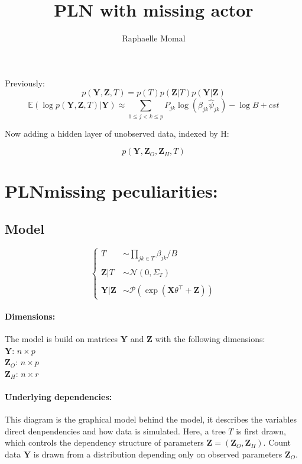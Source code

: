 \documentclass[11pt,a4paper]{article}
\author{Raphaelle Momal}
\title{PLN with missing actor}
\newcommand{\Xbf}{\boldsymbol{X}}
\newcommand{\Ybf}{\boldsymbol{Y}}
\newcommand{\Zbf}{\boldsymbol{Z}}
\newcommand{\Esp}{\mathds{E}}
\newcommand{\edgeunit}{1.5}
\begin{document}
\maketitle
\vspace{3cm}
\tableofcontents
\newpage
Previously:
$$ p(\Ybf,\Zbf,T) = p(T)p(\Zbf|T)p(\Ybf|\Zbf)$$
$$ \Esp(\log p(\Ybf,\Zbf,T)|\Ybf) \approx \sum_{1 \leq j < k \leq p} P_{jk} \log\left(\beta_{jk} \hat{\psi}_{jk}\right) - \log B + cst$$

Now adding a hidden layer of unobserved data, indexed by H:

$$ p(\Ybf,\Zbf_O,\Zbf_H,T)$$
\section{PLNmissing peculiarities:}

\subsection{Model}

$$\left\{\begin{array}{rl}
T & \sim\prod_{jk \in T} \beta_{jk}/B \\\\
\Zbf|T& \sim\mathcal{N}(0,\Sigma_T)\\\\
\Ybf|\Zbf&\sim\mathcal{P}( \exp( \Xbf\theta^\intercal + \Zbf) )
\end{array} \right.$$

\paragraph{Dimensions:}
The model is build on matrices $\Ybf$ and $\Zbf$ with the following dimensions:\\
$\Ybf$: $n\times p$\\
$\Zbf_O$: $n\times p$\\
$\Zbf_H$: $n\times r$


\paragraph{Underlying dependencies:} This diagram is the graphical model behind the model, it describes the variables direct denpendencies and how data is simulated. Here, a tree $T$ is first drawn, which controls the dependency structure of parameters $\Zbf = (\Zbf_O,\Zbf_H)$. Count data $\Ybf$ is drawn from a distribution depending only on observed parameters $\Zbf_O$.
\begin{center}
\end{center}
\end{document}
